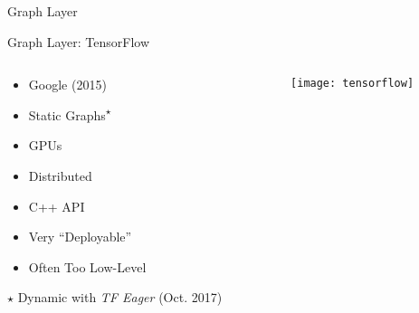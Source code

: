 
\begin{slide}{Graph Layer}
\end{slide}

\begin{slide}{Graph Layer: TensorFlow}
  \begin{columns}
    \begin{column}{0.5\textwidth}
      \vspace{0.7cm}
      \begin{itemize}
        \item Google (2015)
        \item Static Graphs\textsuperscript{$\star$}
        \item GPUs \cmark
        \item Distributed \cmark
        \item C++ API \xmark
        \item Very ``Deployable''
        \item Often Too Low-Level
      \end{itemize}

      \vspace{0.5cm}
      {\footnotesize $\star$ Dynamic with \textit{TF Eager} (Oct. 2017)}
    \end{column}
    \begin{column}{0.4\textwidth}
      \texttt{[image: tensorflow]}
    \end{column}
  \end{columns}
\end{slide}

